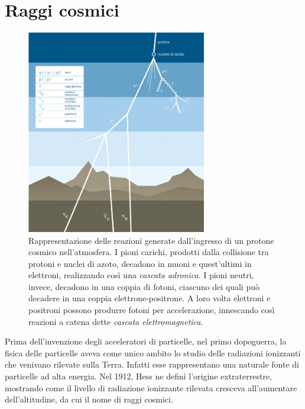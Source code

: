 \documentclass[../main.tex]{subfiles}
\begin{document}
\section{Raggi cosmici}
\begin{figure}[b!]
    \centering
    \includegraphics[width=0.7\textwidth]{cosmic.jpg}
    \caption{Rappresentazione delle reazioni generate dall'ingresso di un protone cosmico nell'atmosfera. I pioni carichi, prodotti dalla collisione tra protoni e nuclei di azoto, decadono in muoni e quest'ultimi in elettroni, realizzando così una \textit{cascata adronica}. I pioni neutri, invece, decadono in una coppia di fotoni, ciascuno dei quali può decadere in una coppia elettrone-positrone. A loro volta elettroni e positroni possono produrre fotoni per accelerazione, innescando così reazioni a catena dette \textit{cascata elettromagnetica}. \cite{as10_vdu}}
    \label{fig:cosmic}
\end{figure}
Prima dell'invenzione degli acceleratori di particelle, nel primo dopoguerra, la fisica delle particelle aveva come unico ambito lo studio delle radiazioni ionizzanti che venivano rilevate sulla Terra. Infatti esse rappresentano una naturale fonte di particelle ad alta energia.
Nel 1912, Hess ne definì l'origine extraterrestre, mostrando come il livello di radiazione ionizzante rilevata cresceva all'aumentare dell'altitudine, da cui il nome di raggi cosmici. 
\end{document}

